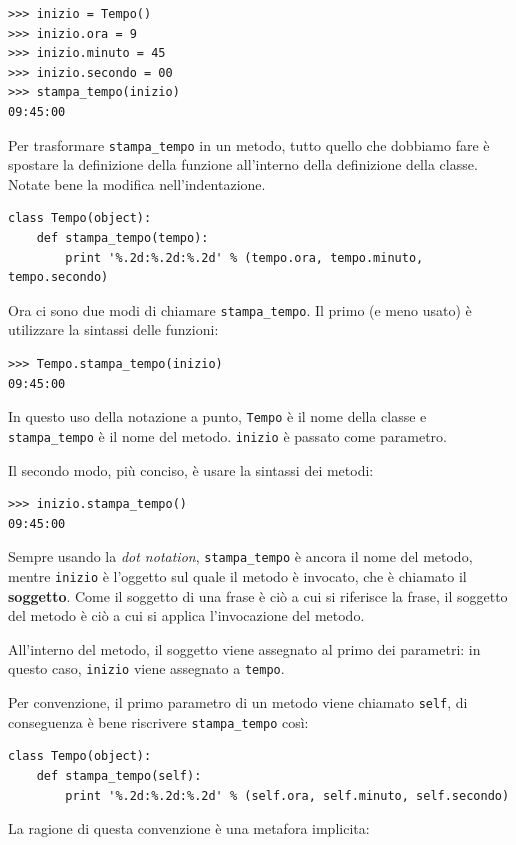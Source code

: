 \documentclass[10pt]{book}
\begin{document}
\begin{verbatim}
>>> inizio = Tempo()
>>> inizio.ora = 9
>>> inizio.minuto = 45
>>> inizio.secondo = 00
>>> stampa_tempo(inizio)
09:45:00
\end{verbatim}
%
Per trasformare \verb"stampa_tempo" in un metodo, tutto quello che dobbiamo fare è spostare la definizione della funzione all'interno della definizione della classe. Notate bene la modifica nell'indentazione.

\begin{verbatim}
class Tempo(object):
    def stampa_tempo(tempo):
        print '%.2d:%.2d:%.2d' % (tempo.ora, tempo.minuto, tempo.secondo)
\end{verbatim}
%
Ora ci sono due modi di chiamare \verb"stampa_tempo".  Il primo (e meno usato) è utilizzare la sintassi delle funzioni:


\begin{verbatim}
>>> Tempo.stampa_tempo(inizio)
09:45:00
\end{verbatim}
%
In questo uso della notazione a punto, {\tt Tempo} è il nome della classe e
 \verb"stampa_tempo" è il nome del metodo.  {\tt inizio} è passato come parametro.

Il secondo modo, più conciso, è usare la sintassi dei metodi:

\begin{verbatim}
>>> inizio.stampa_tempo()
09:45:00
\end{verbatim}
%
Sempre usando la {\em dot notation}, \verb"stampa_tempo" è ancora il nome del metodo, mentre {\tt inizio} è l'oggetto sul quale il metodo è invocato, che è chiamato il {\bf soggetto}.  Come il soggetto di una frase è ciò a cui si riferisce la frase, il soggetto del metodo è ciò a cui si applica l'invocazione del metodo.

All'interno del metodo, il soggetto viene assegnato al primo dei parametri: in questo caso, {\tt inizio} viene assegnato a {\tt tempo}.

Per convenzione, il primo parametro di un metodo viene chiamato {\tt self}, di conseguenza è bene riscrivere \verb"stampa_tempo" così:

\begin{verbatim}
class Tempo(object):
    def stampa_tempo(self):
        print '%.2d:%.2d:%.2d' % (self.ora, self.minuto, self.secondo)
\end{verbatim}
%
La ragione di questa convenzione è una metafora implicita:
\end{document}
